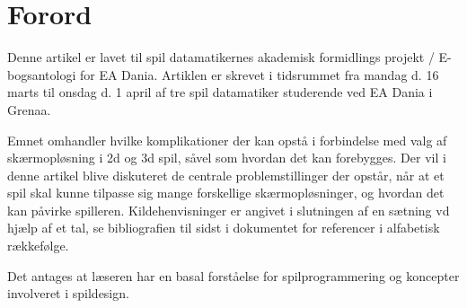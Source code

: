 
\chapter*{Forord}
Denne artikel er lavet til spil datamatikernes akademisk formidlings projekt / E-bogsantologi for EA Dania. Artiklen er skrevet i tidsrummet fra mandag d. 16 marts til onsdag d. 1 april af tre spil datamatiker studerende ved EA Dania i Grenaa.

Emnet omhandler hvilke komplikationer der kan opstå i forbindelse med valg af skærmopløsning i 2d og 3d spil, såvel som hvordan det kan forebygges. Der vil i denne artikel blive diskuteret de centrale problemstillinger der opstår, når at et spil skal kunne tilpasse sig mange forskellige skærmopløsninger, og hvordan det kan påvirke spilleren. Kildehenvisninger er angivet i slutningen af en sætning vd hjælp af et tal, se bibliografien til sidst i dokumentet for referencer i alfabetisk rækkefølge.

Det antages at læseren har en basal forståelse for spilprogrammering og koncepter involveret i spildesign.


	\newpage
		\pagestyle{fancy}
		\lhead{} \chead{} \rhead{} \lfoot{} \cfoot{} \rfoot{} 	
	
	\tableofcontents
	
	
	\newpage	
	\pagestyle{fancy}
		\lhead{}
		\renewcommand{\headrulewidth}{0.4pt}
		\renewcommand{\footrulewidth}{0.4pt}
	
	\setcounter{page}{1}	
		
		
		
		\clearpage	
		
		

		\clearpage	
	
		
		
		\clearpage		
			
		
		
		\clearpage
		
		
		
	\printbibliography


